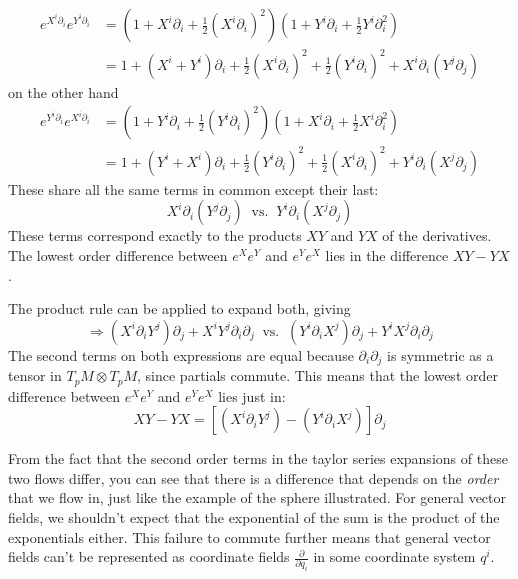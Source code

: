 		\begin{align*}
			e^{X^i \partial_i} e^{Y^i \partial_i} &= (1 + X^i \partial_i + \frac{1}{2} {(X^i \partial_i)^2})(1 + Y^i \partial_i + \frac{1}{2} {Y^i \partial_i^2})\\
			& = 1 + (X^i + Y^i) \partial_i + \frac{1}{2} (X^i \partial_i)^2 + \frac{1}{2}(Y^i \partial_i)^2 + X^i \partial_i (Y^j \partial_j)
		\end{align*}
		on the other hand 
		\begin{align*}
			e^{Y^i \partial_i} e^{X^i \partial_i} &= (1 + Y^i \partial_i + \frac{1}{2} {(Y^i \partial_i)^2})(1 + X^i \partial_i + \frac{1}{2} {X^i \partial_i^2})\\
			& = 1 + (Y^i + X^i) \partial_i + \frac{1}{2} (Y^i \partial_i)^2 + \frac{1}{2}(X^i \partial_i)^2 + Y^i \partial_i (X^j \partial_j)
		\end{align*}
		These share all the same terms in common except their last:
		\begin{equation*}
			X^i \partial_i (Y^j \partial_j) ~\text{ vs. }~ Y^i \partial_i (X^j \partial_j)
		\end{equation*}
		These terms correspond exactly to the products $XY$ and $YX$ of the derivatives. The lowest order difference between $e^X e^Y$ and $e^Y e^X$ lies in the difference $XY - YX$. 
		
		The product rule can be applied to expand both, giving
		\begin{equation*}
			\Rightarrow (X^i \partial_i Y^j) \partial_j + X^i Y^j \partial_i \partial_j  ~\text{ vs. }~ (Y^i \partial_i X^j) \partial_j + Y^i X^j \partial_i \partial_j
		\end{equation*}
		The second terms on both expressions are equal because $\partial_i \partial_j$ is symmetric as a tensor in $T_p M \otimes T_p M$, since partials commute. This means that the lowest order difference between $e^X e^Y$ and $e^Y e^X$ lies just in:
		\begin{equation}\label{eq:first_commutator}
			XY - YX = \left[  (X^i \partial_i Y^j) - (Y^i \partial_i X^j) \right] \partial_j 
		\end{equation}
		
		From the fact that the second order terms in the taylor series expansions of these two flows differ, you can see that there is a difference that depends on the \emph{order} that we flow in, just like the example of the sphere illustrated. For general vector fields, we shouldn't expect that the exponential of the sum is the product of the exponentials either. %
		This failure to commute further means that general vector fields can't be represented as coordinate fields  $\frac{\partial}{\partial q_i}$ in some coordinate system $q^i$. 
		
